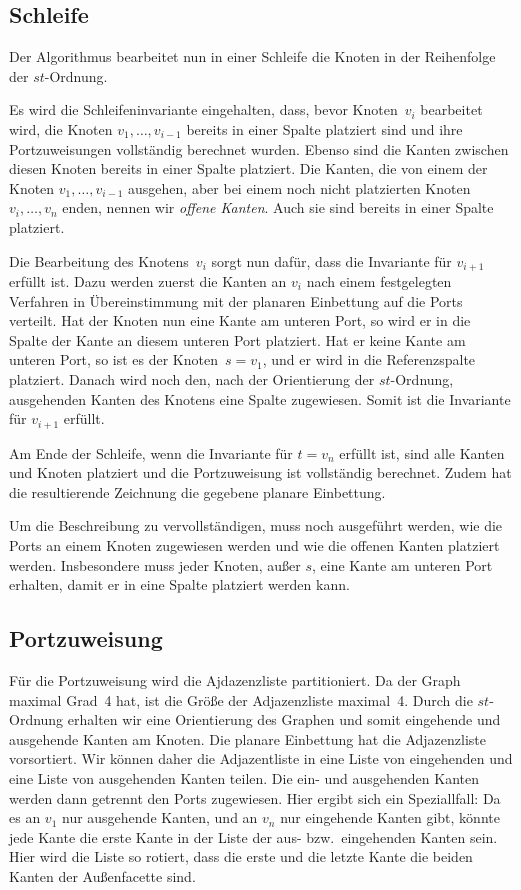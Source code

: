 \documentclass[a4paper]{scrreprt}
\theoremstyle{definition}
\begin{document}
\subsection{Schleife}

Der Algorithmus bearbeitet nun in einer Schleife die Knoten in der Reihenfolge der $st$-Ordnung.

Es wird die Schleifeninvariante eingehalten, dass, bevor Knoten~$v_i$ bearbeitet wird, die Knoten $v_1, \dots, v_{i-1}$ bereits in einer Spalte platziert sind und ihre Portzuweisungen vollständig berechnet wurden. Ebenso sind die Kanten zwischen diesen Knoten bereits in einer Spalte platziert. Die Kanten, die von einem der Knoten $v_1, \dots, v_{i-1}$ ausgehen, aber bei einem noch nicht platzierten Knoten $v_i, \dots, v_n$ enden, nennen wir \emph{offene Kanten}. Auch sie sind bereits in einer Spalte platziert.

Die Bearbeitung des Knotens~$v_i$ sorgt nun dafür, dass die Invariante für $v_{i+1}$ erfüllt ist. Dazu werden zuerst die Kanten an $v_i$ nach einem festgelegten Verfahren in Übereinstimmung mit der planaren Einbettung auf die Ports verteilt. Hat der Knoten nun eine Kante am unteren Port, so wird er in die Spalte der Kante an diesem unteren Port platziert. Hat er keine Kante am unteren Port, so ist es der Knoten~$s = v_1$, und er wird in die Referenzspalte platziert. Danach wird noch den, nach der Orientierung der $st$-Ordnung, ausgehenden Kanten des Knotens eine Spalte zugewiesen. Somit ist die Invariante für $v_{i+1}$ erfüllt.

Am Ende der Schleife, wenn die Invariante für $t = v_n$ erfüllt ist, sind alle Kanten und Knoten platziert und die Portzuweisung ist vollständig berechnet. Zudem hat die resultierende Zeichnung die gegebene planare Einbettung.

Um die Beschreibung zu vervollständigen, muss noch ausgeführt werden, wie die Ports an einem Knoten zugewiesen werden und wie die offenen Kanten platziert werden. Insbesondere muss jeder Knoten, außer $s$, eine Kante am unteren Port erhalten, damit er in eine Spalte platziert werden kann.

\subsection{Portzuweisung}
\label{sec:portdistribution}

Für die Portzuweisung wird die Ajdazenzliste partitioniert. Da der Graph maximal Grad~4 hat, ist die Größe der Adjazenzliste maximal~4. Durch die $st$-Ordnung erhalten wir eine Orientierung des Graphen und somit eingehende und ausgehende Kanten am Knoten. Die planare Einbettung hat die Adjazenzliste vorsortiert. Wir können daher die Adjazentliste in eine Liste von eingehenden und eine Liste von ausgehenden Kanten teilen. Die ein- und ausgehenden Kanten werden dann getrennt den Ports zugewiesen. Hier ergibt sich ein Speziallfall: Da es an $v_1$ nur ausgehende Kanten, und an $v_n$ nur eingehende Kanten gibt, könnte jede Kante die erste Kante in der Liste der aus- bzw.\ eingehenden Kanten sein. Hier wird die Liste so rotiert, dass die erste und die letzte Kante die beiden Kanten der Außenfacette sind.
\end{document}
